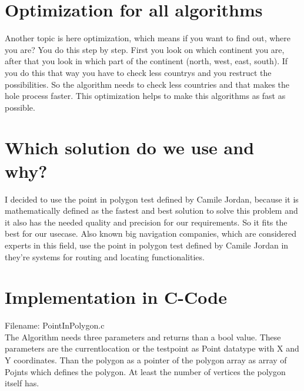 \documentclass[12pt,a4paper]{scrreprt}
\begin{document}
\chapter{Optimization for all algorithms}
\begin{flushleft}
Another topic is here optimization, which means if you want to find out, where you are? You do this step by step. First you look on which continent you are, after that you look in which part of the continent (north, west, east, south). If you do this that way you have to check less countrys and you restruct the possibilities. So the algorithm needs to check less countries and that makes the hole process faster. This optimization helps to make this algorithms as fast as possible.
\end{flushleft}


\chapter{Which solution do we use and why?}
\begin{flushleft}
I decided to use the point in polygon test defined by Camile Jordan, because it is mathematically defined as the fastest and best solution to solve this problem and it also has the needed quality and precision for our requirements. So it fits the best for our usecase. Also known big navigation companies, which are considered experts in this field, use the point in polygon test defined by Camile Jordan in they're systems for routing and locating functionalities.
\end{flushleft}

\chapter{Implementation in C-Code}
\begin{flushleft}
Filename: PointInPolygon.c
\\
The Algorithm needs three parameters and returns than a bool value. These parameters are the currentlocation or the testpoint as Point datatype with X and Y coordinates. Than the polygon as a pointer of the polygon array as array of Pojnts which defines the polygon.
At least the number of vertices the polygon itself has.\\


\end{flushleft}


\newpage
\end{document}

